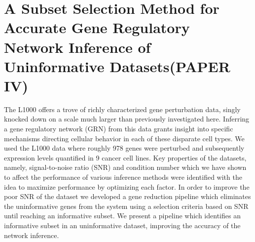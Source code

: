 

\section{A Subset Selection Method for Accurate Gene Regulatory Network Inference of Uninformative Datasets(PAPER IV)}

The L1000 offers a trove of richly characterized gene perturbation data, singly knocked down on a scale much larger than previously investigated here. Inferring a gene regulatory network (GRN) from this data grants insight into specific mechanisms directing cellular behavior in each of these disparate cell types. We used the L1000 data where roughly 978 genes were perturbed and subsequently expression levels quantified in 9 cancer cell lines. Key properties of the datasets, namely, signal-to-noise ratio (SNR) and condition number which we have shown to affect the performance of various inference methods were identified with the idea to maximize performance by optimizing each factor. 
In order to improve the poor SNR of the dataset we developed a gene reduction pipeline which eliminates the uninformative genes from the system using a selection criteria based on SNR until reaching an informative subset. We present a pipeline which identifies an informative subset in an uninformative dataset, improving the accuracy of the network inference.